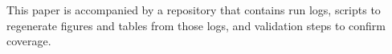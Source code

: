 This paper is accompanied by a repository that contains run logs, scripts to regenerate figures and tables from those logs, and validation steps to confirm coverage.
